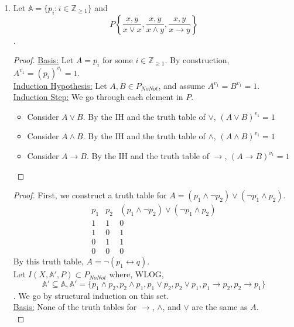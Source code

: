 \documentclass[12pt]{article}
\begin{document}
\begin{enumerate}
    \item 
    \begin{tasks}
        \task Let $\mathbb{A}=\{p_i:i\in\mathbb{Z}_{\geq 1}\}$ and \[P\left\{\frac{x,y}{x\lor x},\frac{x,y}{x\land y},\frac{x,y}{x\to y}\right\}\].
        \task 
        \begin{proof}
            \underline{Basis:} Let $A=p_i$ for some $i\in\mathbb{Z}_{\geq 1}$. By construction, $A^{v_1}=(p_i)^{v_1}=1$.\\
            \underline{Induction Hypothesis:} Let $A, B\in P_{NoNot}$, and assume $A^{v_1}=B^{v_1}=1$.\\
            \underline{Induction Step:} We go through each element in $P$.
            \begin{itemize}
                \item Consider $A\lor B$. By the IH and the truth table of $\lor$, $(A\lor B)^{v_1}=1$
                \item Consider $A\land B$. By the IH and the truth table of $\land$, $(A\land B)^{v_1}=1$
                \item Consider $A\to B$. By the IH and the truth table of $\to$, $(A\to B)^{v_1}=1$
            \end{itemize}
        \end{proof}
        \task 
        \begin{proof}
            First, we construct a truth table for $A=(p_1\land \neg p_2)\lor (\neg p_1\land p_2)$.\\
            \[\begin{array}{c|c|c}
                p_1 & p_2 & (p_1\land \neg p_2)\lor (\neg p_1\land p_2)\\\hline
                1 & 1 & 0\\
                1 & 0 & 1\\
                0 & 1 & 1\\
                0 & 0 & 0
            \end{array}
            \]
            By this truth table, $A=\neg (p_1\leftrightarrow q)$. \\
            Let $I(X,\mathbb{A}', P)\subset P_{NoNot}$ where, WLOG, \[\mathbb{A}'\subseteq\mathbb{A}, \mathbb{A}'=\{p_1\land p_2, p_2\land p_1,p_1\lor p_2,p_2\lor p_1,p_1\to p_2, p_2\to p_1\}\]. We go by structural induction on this set.\\
            \underline{Basis:} None of the truth tables for $\to$, $\land$, and $\lor$ are the same as $A$.\\

\end{proof}
\end{tasks}
\end{enumerate}
\end{document}
